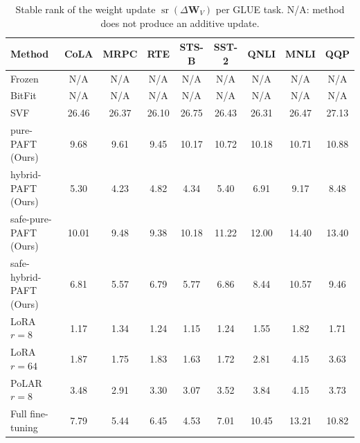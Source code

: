 \begin{table}[t]
\centering
\small
\caption{Stable rank of the weight update $\operatorname{sr}(\Delta\mathbf{W}_V)$ per GLUE task. N/A: method does not produce an additive update.}
\label{tab:sr_delta_w}
\begin{tabular}{lcccccccc}
\toprule
\textbf{Method} & \textbf{CoLA} & \textbf{MRPC} & \textbf{RTE} & \textbf{STS-B} & \textbf{SST-2} & \textbf{QNLI} & \textbf{MNLI} & \textbf{QQP} \\
\midrule
Frozen & N/A & N/A & N/A & N/A & N/A & N/A & N/A & N/A \\
BitFit & N/A & N/A & N/A & N/A & N/A & N/A & N/A & N/A \\
\midrule
SVF & 26.46 & 26.37 & 26.10 & 26.75 & 26.43 & 26.31 & 26.47 & 27.13 \\
pure-PAFT (Ours) & 9.68 & 9.61 & 9.45 & 10.17 & 10.72 & 10.18 & 10.71 & 10.88 \\
hybrid-PAFT (Ours) & 5.30 & 4.23 & 4.82 & 4.34 & 5.40 & 6.91 & 9.17 & 8.48 \\
safe-pure-PAFT (Ours) & 10.01 & 9.48 & 9.38 & 10.18 & 11.22 & 12.00 & 14.40 & 13.40 \\
safe-hybrid-PAFT (Ours) & 6.81 & 5.57 & 6.79 & 5.77 & 6.86 & 8.44 & 10.57 & 9.46 \\
\midrule
LoRA $r{=}8$ & 1.17 & 1.34 & 1.24 & 1.15 & 1.24 & 1.55 & 1.82 & 1.71 \\
LoRA $r{=}64$ & 1.87 & 1.75 & 1.83 & 1.63 & 1.72 & 2.81 & 4.15 & 3.63 \\
PoLAR $r{=}8$ & 3.48 & 2.91 & 3.30 & 3.07 & 3.52 & 3.84 & 4.15 & 3.73 \\
\midrule
Full fine-tuning & 7.79 & 5.44 & 6.45 & 4.53 & 7.01 & 10.45 & 13.21 & 10.82 \\
\bottomrule
\end{tabular}
\end{table}